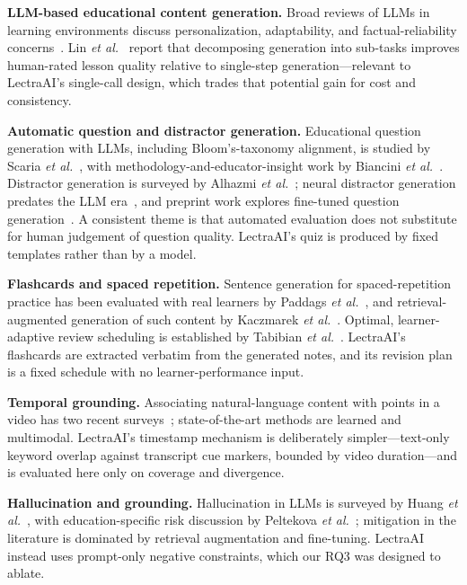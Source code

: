 \documentclass[conference]{IEEEtran}
\begin{document}
\textbf{LLM-based educational content generation.} Broad reviews of LLMs in learning environments discuss personalization, adaptability, and factual-reliability concerns~\cite{shahzad2025}. Lin \emph{et al.}~\cite{lin2025} report that decomposing generation into sub-tasks improves human-rated lesson quality relative to single-step generation---relevant to LectraAI's single-call design, which trades that potential gain for cost and consistency.

\textbf{Automatic question and distractor generation.} Educational question generation with LLMs, including Bloom's-taxonomy alignment, is studied by Scaria \emph{et al.}~\cite{scaria2024}, with methodology-and-educator-insight work by Biancini \emph{et al.}~\cite{biancini2024}. Distractor generation is surveyed by Alhazmi \emph{et al.}~\cite{alhazmi2024}; neural distractor generation predates the LLM era~\cite{qiu2020}, and preprint work explores fine-tuned question generation~\cite{ehsan2025}. A consistent theme is that automated evaluation does not substitute for human judgement of question quality. LectraAI's quiz is produced by fixed templates rather than by a model.

\textbf{Flashcards and spaced repetition.} Sentence generation for spaced-repetition practice has been evaluated with real learners by Paddags \emph{et al.}~\cite{paddags2024}, and retrieval-augmented generation of such content by Kaczmarek \emph{et al.}~\cite{kaczmarek2025}. Optimal, learner-adaptive review scheduling is established by Tabibian \emph{et al.}~\cite{tabibian2019}. LectraAI's flashcards are extracted verbatim from the generated notes, and its revision plan is a fixed schedule with no learner-performance input.

\textbf{Temporal grounding.} Associating natural-language content with points in a video has two recent surveys~\cite{zhang2023,liu2023}; state-of-the-art methods are learned and multimodal. LectraAI's timestamp mechanism is deliberately simpler---text-only keyword overlap against transcript cue markers, bounded by video duration---and is evaluated here only on coverage and divergence.

\textbf{Hallucination and grounding.} Hallucination in LLMs is surveyed by Huang \emph{et al.}~\cite{huang2023}, with education-specific risk discussion by Peltekova \emph{et al.}~\cite{peltekova2026}; mitigation in the literature is dominated by retrieval augmentation and fine-tuning. LectraAI instead uses prompt-only negative constraints, which our RQ3 was designed to ablate.
\end{document}
